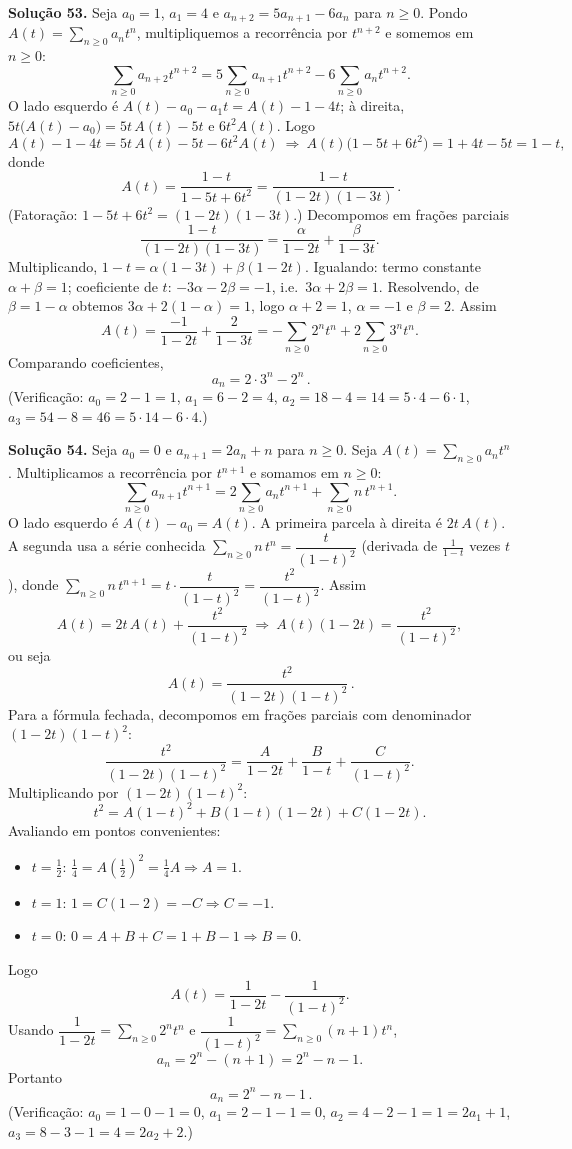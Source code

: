 \bigskip\noindent\textbf{Solução 53.}\quad
Seja $a_0=1$, $a_1=4$ e $a_{n+2}=5a_{n+1}-6a_n$ para $n\ge0$. Pondo $A(t)=\sum_{n\ge0}a_n t^n$, multipliquemos a recorrência por $t^{n+2}$ e somemos em $n\ge0$:
\[
\sum_{n\ge0}a_{n+2}t^{n+2}=5\sum_{n\ge0}a_{n+1}t^{n+2}-6\sum_{n\ge0}a_n t^{n+2}.
\]
O lado esquerdo é $A(t)-a_0-a_1t=A(t)-1-4t$; à direita, $5t\big(A(t)-a_0\big)=5t\,A(t)-5t$ e $6t^2A(t)$. Logo
\[
A(t)-1-4t=5t\,A(t)-5t-6t^2A(t)\ \Longrightarrow\ A(t)\big(1-5t+6t^2\big)=1+4t-5t=1-t,
\]
donde
\[
\boxed{\,A(t)=\frac{1-t}{1-5t+6t^2}=\frac{1-t}{(1-2t)(1-3t)}\,}.
\]
(Fatoração: $1-5t+6t^2=(1-2t)(1-3t)$.) Decompomos em frações parciais
\[
\frac{1-t}{(1-2t)(1-3t)}=\frac{\alpha}{1-2t}+\frac{\beta}{1-3t}.
\]
Multiplicando, $1-t=\alpha(1-3t)+\beta(1-2t)$. Igualando: termo constante $\alpha+\beta=1$; coeficiente de $t$: $-3\alpha-2\beta=-1$, i.e.\ $3\alpha+2\beta=1$. Resolvendo, de $\beta=1-\alpha$ obtemos $3\alpha+2(1-\alpha)=1$, logo $\alpha+2=1$, $\alpha=-1$ e $\beta=2$. Assim
\[
A(t)=\frac{-1}{1-2t}+\frac{2}{1-3t}=-\sum_{n\ge0}2^n t^n+2\sum_{n\ge0}3^n t^n.
\]
Comparando coeficientes,
\[
\boxed{\,a_n=2\cdot3^n-2^n\,}.
\]
(Verificação: $a_0=2-1=1$, $a_1=6-2=4$, $a_2=18-4=14=5\cdot4-6\cdot1$, $a_3=54-8=46=5\cdot14-6\cdot4$.)


\bigskip\noindent\textbf{Solução 54.}\quad
Seja $a_0=0$ e $a_{n+1}=2a_n+n$ para $n\ge0$. Seja $A(t)=\sum_{n\ge0}a_n t^n$. Multiplicamos a recorrência por $t^{n+1}$ e somamos em $n\ge0$:
\[
\sum_{n\ge0}a_{n+1}t^{n+1}=2\sum_{n\ge0}a_n t^{n+1}+\sum_{n\ge0}n\,t^{n+1}.
\]
O lado esquerdo é $A(t)-a_0=A(t)$. A primeira parcela à direita é $2t\,A(t)$. A segunda usa a série conhecida $\sum_{n\ge0}n\,t^n=\dfrac{t}{(1-t)^2}$ (derivada de $\frac{1}{1-t}$ vezes $t$), donde $\sum_{n\ge0}n\,t^{n+1}=t\cdot\dfrac{t}{(1-t)^2}=\dfrac{t^2}{(1-t)^2}$. Assim
\[
A(t)=2t\,A(t)+\frac{t^2}{(1-t)^2}\ \Longrightarrow\ A(t)(1-2t)=\frac{t^2}{(1-t)^2},
\]
ou seja
\[
\boxed{\,A(t)=\frac{t^2}{(1-2t)(1-t)^2}\,}.
\]
Para a fórmula fechada, decompomos em frações parciais com denominador $(1-2t)(1-t)^2$:
\[
\frac{t^2}{(1-2t)(1-t)^2}=\frac{A}{1-2t}+\frac{B}{1-t}+\frac{C}{(1-t)^2}.
\]
Multiplicando por $(1-2t)(1-t)^2$:
\[
t^2=A(1-t)^2+B(1-t)(1-2t)+C(1-2t).
\]
Avaliando em pontos convenientes:
\begin{itemize}
\item $t=\tfrac12$: $\tfrac14=A(\tfrac12)^2=\tfrac14 A\Rightarrow A=1$.
\item $t=1$: $1=C(1-2)=-C\Rightarrow C=-1$.
\item $t=0$: $0=A+B+C=1+B-1\Rightarrow B=0$.
\end{itemize}
Logo
\[
A(t)=\frac{1}{1-2t}-\frac{1}{(1-t)^2}.
\]
Usando $\dfrac{1}{1-2t}=\sum_{n\ge0}2^n t^n$ e $\dfrac{1}{(1-t)^2}=\sum_{n\ge0}(n+1)t^n$,
\[
a_n=2^n-(n+1)=2^n-n-1.
\]
Portanto
\[
\boxed{\,a_n=2^n-n-1\,}.
\]
(Verificação: $a_0=1-0-1=0$, $a_1=2-1-1=0$, $a_2=4-2-1=1=2a_1+1$, $a_3=8-3-1=4=2a_2+2$.)


